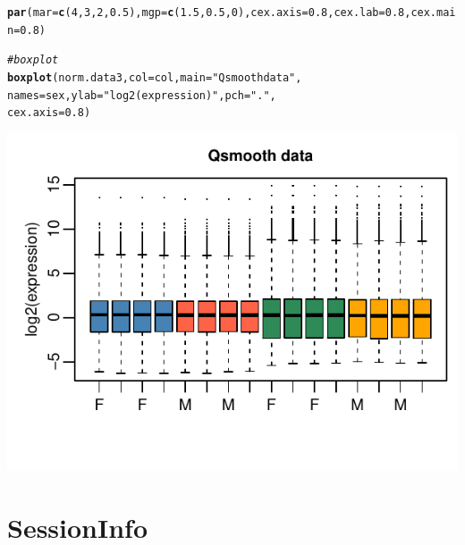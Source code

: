 \documentclass{article}\usepackage[]{graphicx}\usepackage[usenames,dvipsnames]{color}
\makeatletter
\def\maxwidth{ %
  \ifdim\Gin@nat@width>\linewidth
    \linewidth
  \else
    \Gin@nat@width
  \fi
}
\newcommand{\hlnum}[1]{\textcolor[rgb]{0.686,0.059,0.569}{#1}}%
\newcommand{\hlstr}[1]{\textcolor[rgb]{0.192,0.494,0.8}{#1}}%
\newcommand{\hlcom}[1]{\textcolor[rgb]{0.678,0.584,0.686}{\textit{#1}}}%
\newcommand{\hlstd}[1]{\textcolor[rgb]{0.345,0.345,0.345}{#1}}%
\newcommand{\hlkwc}[1]{\textcolor[rgb]{0.333,0.667,0.333}{#1}}%
\newcommand{\hlkwd}[1]{\textcolor[rgb]{0.737,0.353,0.396}{\textbf{#1}}}%
\newenvironment{kframe}{%
 \def\at@end@of@kframe{}%
 \ifinner\ifhmode%
  \def\at@end@of@kframe{\end{minipage}}%
  \begin{minipage}{\columnwidth}%
 \fi\fi%
 \def\FrameCommand##1{\hskip\@totalleftmargin \hskip-\fboxsep
 \colorbox{shadecolor}{##1}\hskip-\fboxsep
     \hskip-\linewidth \hskip-\@totalleftmargin \hskip\columnwidth}%
 \MakeFramed {\advance\hsize-\width
   \@totalleftmargin\z@ \linewidth\hsize
   \@setminipage}}%
 {\par\unskip\endMakeFramed%
 \at@end@of@kframe}
\newenvironment{knitrout}{}{} %
\makeatother
\begin{document}
\begin{knitrout}
\color{fgcolor}\begin{kframe}
\begin{alltt}
\hlkwd{par}\hlstd{(}\hlkwc{mar}\hlstd{=}\hlkwd{c}\hlstd{(}\hlnum{4}\hlstd{,} \hlnum{3}\hlstd{,} \hlnum{2}\hlstd{,} \hlnum{0.5}\hlstd{),} \hlkwc{mgp}\hlstd{=}\hlkwd{c}\hlstd{(}\hlnum{1.5}\hlstd{,} \hlnum{0.5}\hlstd{,} \hlnum{0}\hlstd{),} \hlkwc{cex.axis}\hlstd{=}\hlnum{0.8}\hlstd{,} \hlkwc{cex.lab}\hlstd{=}\hlnum{0.8}\hlstd{,} \hlkwc{cex.main}\hlstd{=}\hlnum{0.8}\hlstd{)}

\hlcom{# boxplot}
\hlkwd{boxplot}\hlstd{(norm.data3,} \hlkwc{col}\hlstd{=col,} \hlkwc{main}\hlstd{=}\hlstr{"Qsmooth data"}\hlstd{,}
        \hlkwc{names}\hlstd{=sex,} \hlkwc{ylab}\hlstd{=}\hlstr{"log2(expression)"}\hlstd{,} \hlkwc{pch}\hlstd{=}\hlstr{"."}\hlstd{,}
        \hlkwc{cex.axis}\hlstd{=}\hlnum{0.8}\hlstd{)}
\end{alltt}
\end{kframe}

{\centering \includegraphics[width=\maxwidth]{figure/qsmooth14-1} 

}



\end{knitrout}

\section{SessionInfo}
\end{document}
